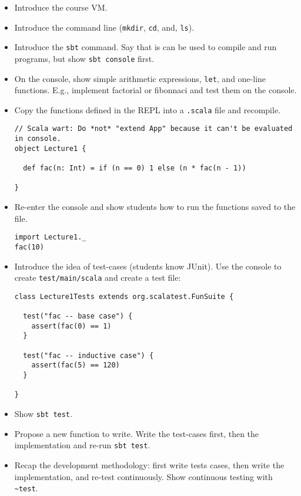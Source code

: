 \documentclass{book}
\begin{document}
\begin{itemize}

\item Introduce the course VM.

\item Introduce the command line (\verb|mkdir|, \verb|cd|, and, \verb|ls|).

\item Introduce the \verb|sbt| command. Say that is can be used to
compile and run programs, but show \verb|sbt console| first.

\item On the console, show simple arithmetic expressions,
\verb|let|, and one-line functions. E.g., implement factorial or fibonnaci
and test them on the console.

\item Copy the functions defined in the REPL into a \verb|.scala| file and
 recompile.

\begin{verbatim}
// Scala wart: Do *not* "extend App" because it can't be evaluated in console.
object Lecture1 {

  def fac(n: Int) = if (n == 0) 1 else (n * fac(n - 1))

}
\end{verbatim}

\item Re-enter the console and show students how to run the functions saved
to the file.

\begin{verbatim}
import Lecture1._
fac(10)
\end{verbatim}

\item Introduce the idea of test-cases (students know JUnit). Use the console
to create \verb|test/main/scala| and create a test file:

\begin{verbatim}
class Lecture1Tests extends org.scalatest.FunSuite {

  test("fac -- base case") {
    assert(fac(0) == 1)
  }

  test("fac -- inductive case") {
    assert(fac(5) == 120)
  }

}
\end{verbatim}

\item Show \verb|sbt test|.

\item Propose a new function to write. Write the test-cases first, then
the implementation and re-run \verb|sbt test|.

\item Recap the development methodology: first write tests cases, then
write the implementation, and re-test continuously. Show continuous
testing with \verb|~test|.

\end{itemize}
\end{document}

